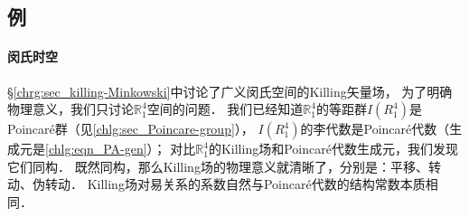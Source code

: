 






\subsection{例}\label{chlg:sec_killing-example}

\paragraph{闵氏时空}
\S\ref{chrg:sec_killing-Minkowski}中讨论了广义闵氏空间的Killing矢量场，
为了明确物理意义，我们只讨论$\mathbb{R}^4_1$空间的问题．
我们已经知道$\mathbb{R}^4_1$的等距群$I({R}^4_1)$是Poincar\'{e}群（见\ref{chlg:sec_Poincare-group}），
$I({R}^4_1)$的李代数是Poincar\'{e}代数（生成元是\eqref{chlg:eqn_PA-gen}）；
对比$\mathbb{R}^4_1$的Killing场和Poincar\'{e}代数生成元，我们发现它们同构．
既然同构，那么Killing场的物理意义就清晰了，分别是：平移、转动、伪转动．
Killing场对易关系的系数自然与Poincar\'{e}代数的结构常数本质相同．



